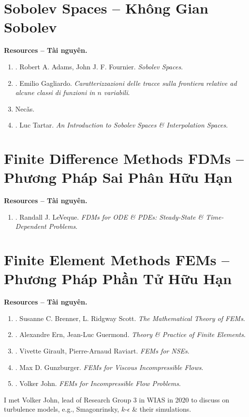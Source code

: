 \documentclass{article}
\begin{document}

\section{Sobolev Spaces -- Không Gian Sobolev}
\textbf{\textsf{Resources -- Tài nguyên.}}
\begin{enumerate}
	\item \cite{Adams_Fournier2003}. {\sc Robert A. Adams, John J. F. Fournier}. {\it Sobolev Spaces}.
	\item \cite{Gagliardo1957}. {\sc Emilio Gagliardo}. {\it Caratterizzazioni delle tracce sulla frontiera relative ad alcune classi di funzioni in {$n$} variabili}.
	\item {\sc Nec\v{a}s}.
	\item \cite{Tartar2006}. {\sc Luc Tartar}. {\it An Introduction to Sobolev Spaces \& Interpolation Spaces}.
\end{enumerate}


\section{Finite Difference Methods FDMs -- Phương Pháp Sai Phân Hữu Hạn}
\textbf{\textsf{Resources -- Tài nguyên.}}
\begin{enumerate}
	\item \cite{LeVeque2007}. {\sc Randall J. LeVeque}. {\it FDMs for ODE \& PDEs: Steady-State \& Time-Dependent Problems}.
\end{enumerate}


\section{Finite Element Methods FEMs -- Phương Pháp Phần Tử Hữu Hạn}
\textbf{\textsf{Resources -- Tài nguyên.}}
\begin{enumerate}
	\item \cite{Brenner_Scott2008}. {\sc Susanne C. Brenner, L. Ridgway Scott}. {\it The Mathematical Theory of FEMs}.
	\item \cite{Ern_Guermond2004}. {\sc Alexandre Ern, Jean-Luc Guermond}. {\it Theory \& Practice of Finite Elements}.
	\item \cite{Girault_Raviart1986}. {\sc Vivette Girault, Pierre-Arnaud Raviart}. {\it FEMs for NSEs}.
	\item \cite{Gunzburger1989}. {\sc Max D. Gunzburger}. {\it FEMs for Viscous Incompressible Flows}.
	\item \cite{John2016}. {\sc Volker John}. {\it FEMs for Incompressible Flow Problems}.
\end{enumerate}
I met {\sc Volker John}, lead of Research Group 3 in WIAS in 2020 to discuss on turbulence models, e.g., Smagonrinsky, $k$-$\epsilon$ \& their simulations.
\end{document}
